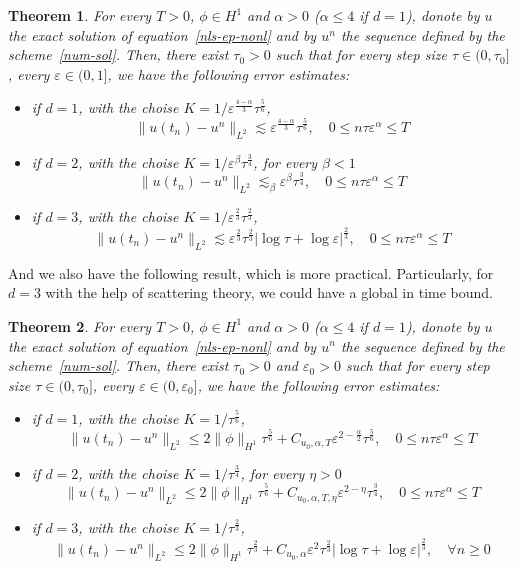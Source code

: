 \documentclass[10pt,a4paper]{article}
\newtheorem{theorem}{Theorem}[section]
\begin{document}
  \begin{theorem}
    For every \( T > 0 \), \( \phi \in H^1 \) and \(\alpha > 0\) (\(\alpha \leq 4\) 
    if \(d=1\)), donote by \(u\) the exact solution of equation~\eqref{nls-ep-nonl} 
    and by \(u^n\) the sequence defined by the scheme~\eqref{num-sol}. Then, 
    there exist \(\tau_0 > 0\) such that for every step size \(\tau \in (0,\tau_0]\),
    every \( \varepsilon \in (0,1] \), we have the following error estimates:
    \begin{itemize}
      \item if \(d=1\), with the choise \(K=1/\varepsilon^\frac{4-\alpha}3\tau^\frac56\),
        \[ \|u(t_n)-u^n\|_{L^2} \lesssim \varepsilon^\frac{4-\alpha}3\tau^\frac56, \quad 
        0 \leq n\tau\varepsilon^\alpha \leq T \]
      \item if \(d=2\), with the choise \(K=1/\varepsilon^\beta\tau^\frac34\),
        for every \(\beta<1\) 
        \[ \|u(t_n)-u^n\|_{L^2} \lesssim_\beta \varepsilon^\beta \tau^\frac34, \quad 
        0 \leq n\tau\varepsilon^\alpha \leq T \]
      \item if \(d=3\), with the choise \(K=1/\varepsilon^\frac23\tau^\frac23\),
        \[ \|u(t_n)-u^n\|_{L^2} \lesssim \varepsilon^\frac23 \tau^\frac23|\log\tau+\log\varepsilon|^\frac23, 
        \quad 0 \leq n\tau\varepsilon^\alpha \leq T \]
    \end{itemize}
  \end{theorem}

  And we also have the following result, which is more practical. Particularly, for \(d=3\)
  with the help of scattering theory, we could have a global in time bound.
  \begin{theorem}
    For every \( T > 0 \), \( \phi \in H^1 \) and \(\alpha > 0\) (\(\alpha \leq 4\) 
    if \(d=1\)), donote by \(u\) the exact solution of equation~\eqref{nls-ep-nonl} 
    and by \(u^n\) the sequence defined by the scheme~\eqref{num-sol}. Then, 
    there exist \(\tau_0 > 0\) and \(\varepsilon_0>0 \) such that for every step size \(\tau \in (0,\tau_0]\),
    every \( \varepsilon \in (0,\varepsilon_0] \), we have the following error estimates:
    \begin{itemize}
      \item if \(d=1\), with the choise \(K=1/\tau^\frac56\),
        \[ \|u(t_n)-u^n\|_{L^2} \leq 2\|\phi\|_{H^1}\tau^\frac56 + C_{u_0,\alpha,T} \varepsilon^{2-\frac\alpha2}\tau^\frac56, \quad 
        0 \leq n\tau\varepsilon^\alpha \leq T \]
      \item if \(d=2\), with the choise \(K=1/\tau^\frac34\),
        for every \(\eta>0\) 
        \[ \|u(t_n)-u^n\|_{L^2} \leq 2\|\phi\|_{H^1}\tau^\frac56 + C_{u_0,\alpha,T,\eta} \varepsilon^{2-\eta} \tau^\frac34, \quad 
        0 \leq n\tau\varepsilon^\alpha \leq T \]
      \item if \(d=3\), with the choise \(K=1/\tau^\frac23\),
        \[ \|u(t_n)-u^n\|_{L^2} \leq 2\|\phi\|_{H^1}\tau^\frac23 + C_{u_0,\alpha} \varepsilon^{2} \tau^\frac23|\log\tau+\log\varepsilon|^\frac23, 
        \quad \forall n \geq 0 \]
    \end{itemize}
  \end{theorem}
\end{document}
